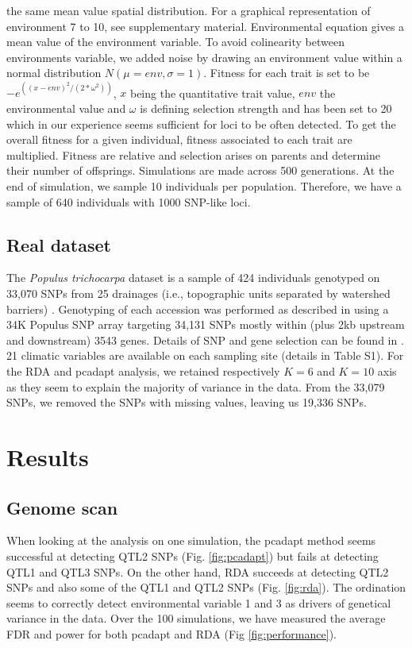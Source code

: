 \documentclass[nogrid]{MBE}%
\begin{document}
the same mean value spatial distribution. For a graphical representation of environment 7 to 10, see supplementary material. Environmental equation gives a mean value of the environment variable. To avoid colinearity between environments variable, we added noise by drawing an environment value within a normal distribution $N(\mu=env, \sigma=1)$. Fitness for each trait is set to be $-e^{((x-env)^2/(2*\omega^2))}$, $x$ being the quantitative trait value, $env$ the environmental value and $\omega$ is defining selection strength and has been set to 20 which in our experience seems sufficient for loci to be often detected. To get the overall fitness for a given individual, fitness associated to each trait are multiplied. Fitness are relative and selection arises on parents and determine their number of offsprings. Simulations are made across 500 generations. At the end of simulation, we sample 10 individuals per population. Therefore, we have a sample of 640 individuals with 1000 SNP-like loci.

\subsection{Real dataset}

The \textit{Populus trichocarpa} dataset is a sample of 424 individuals genotyped on 33,070 SNPs from 25 drainages (i.e., topographic units separated by watershed barriers) \citep{Geraldes2014}. Genotyping of each accession was performed as described in \citep{Geraldes2013} using a 34K Populus SNP array targeting 34,131 SNPs mostly within (plus 2kb upstream and downstream) 3543 genes. Details of SNP and gene selection can be found in \citep{Geraldes2013}. 21 climatic variables are available on each sampling site (details in Table S1). For the RDA and pcadapt analysis, we retained respectively $K=6$ and $K=10$ axis as they seem to explain the majority of variance in the data. From the 33,079 SNPs, we removed the SNPs with missing values, leaving us 19,336 SNPs.

\section{Results}

\subsection{Genome scan}

When looking at the analysis on one simulation, the pcadapt method seems successful at detecting QTL2 SNPs (Fig. \ref{fig:pcadapt}) but fails at detecting QTL1 and QTL3 SNPs. On the other hand, RDA succeeds at detecting QTL2 SNPs and also some of the QTL1 and QTL2 SNPs (Fig. \ref{fig:rda}). The ordination seems to correctly detect environmental variable 1 and 3 as drivers of genetical variance in the data. Over the 100 simulations, we have measured the average FDR and power for both pcadapt and RDA (Fig \ref{fig:performance}). 
\end{document}
